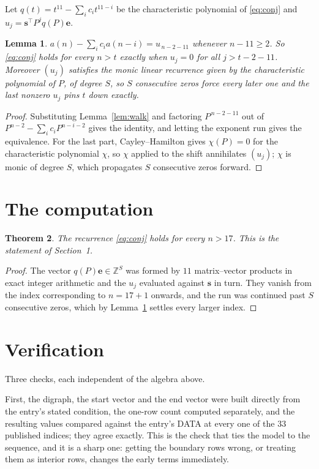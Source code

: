 \documentclass[11pt,a4paper]{article}
\theoremstyle{plain}
\newtheorem{theorem}{Theorem}
\newtheorem{lemma}[theorem]{Lemma}
\theoremstyle{definition}
\begin{document}
Let $q(t)=t^{11}-\sum_i c_i t^{11-i}$ be the characteristic polynomial of
\eqref{eq:conj} and $u_j=\mathbf{s}^{\!\top}P^{j}q(P)\mathbf{e}$.

\begin{lemma}\label{lem:crit}
$a(n)-\sum_i c_i a(n-i)=u_{\,n-2-11}$ whenever $n-11\ge2$. So \eqref{eq:conj}
holds for every $n>t$ exactly when $u_j=0$ for all $j>t-2-11$. Moreover $(u_j)$
satisfies the monic linear recurrence given by the characteristic polynomial of $P$, of
degree $S$, so $S$ consecutive zeros force every later one and the last nonzero $u_j$ pins
$t$ down exactly.
\end{lemma}

\begin{proof}
Substituting Lemma~\ref{lem:walk} and factoring $P^{\,n-2-11}$ out of
$P^{n-2}-\sum_i c_i P^{n-i-2}$ gives the identity, and letting the exponent run gives the
equivalence. For the last part, Cayley--Hamilton gives $\chi(P)=0$ for the characteristic
polynomial $\chi$, so $\chi$ applied to the shift annihilates $(u_j)$; $\chi$ is monic of
degree $S$, which propagates $S$ consecutive zeros forward.
\end{proof}

\section{The computation}

\begin{theorem}
The recurrence \eqref{eq:conj} holds for every $n>17$. This is the statement of
Section~1.
\end{theorem}

\begin{proof}
The vector $q(P)\mathbf{e}\in\mathbb{Z}^{S}$ was formed by $11$ matrix--vector
products in exact integer arithmetic and the $u_j$ evaluated against $\mathbf{s}$ in turn.
They vanish from the index corresponding to $n=17+1$ onwards, and the run was continued
past $S$ consecutive zeros, which by Lemma~\ref{lem:crit} settles every larger index.
\end{proof}

\section{Verification}

Three checks, each independent of the algebra above.

First, the digraph, the start vector and the end vector were built directly from the
entry's stated condition, the one-row count computed separately, and the resulting values
compared against the entry's DATA at every one of the $33$ published indices; they
agree exactly. This is the check that ties the model to the sequence, and it is a sharp one:
getting the boundary rows wrong, or treating them as interior rows, changes the early terms
immediately.
\end{document}
